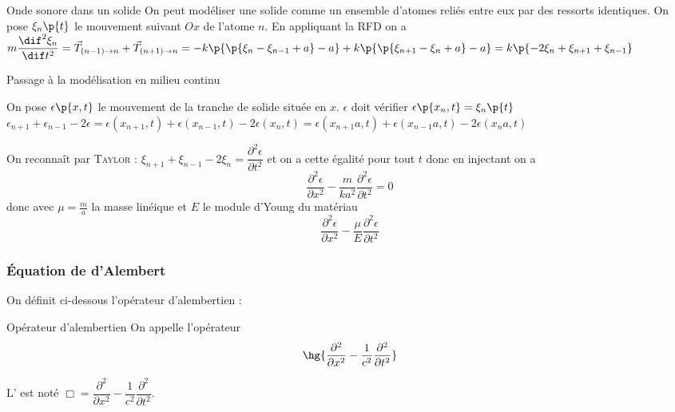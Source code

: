     \begin{example}{Onde sonore dans un solide}{}
        On peut modéliser une solide comme un ensemble d'atomes reliés entre eux par des ressorts identiques. On pose $\xi_n\p{t}$ le mouvement suivant $Ox$ de l'atome $n$. En appliquant la RFD on a $m\dfrac{\dif^2\xi_n}{\dif t^2}=\vec{T}_{(n-1)\to n} + \vec{T}_{(n+1)\to n} = -k\p{\p{\xi_n - \xi_{n-1}+a}-a} + k\p{\p{\xi_{n+1}-\xi_n+a}-a} = k\p{-2\xi_n+\xi_{n+1}+\xi_{n-1}}$

        Passage à la modélisation en milieu continu

        On pose $\epsilon\p{x,t}$ le mouvement de la tranche de solide située en $x$. $\epsilon$ doit vérifier $\epsilon\p{x_n,t}=\xi_n\p{t}$
        $\epsilon_{n+1} + \epsilon_{n-1} - 2\epsilon = \epsilon(x_{n+1},t) + \epsilon(x_{n-1},t) - 2\epsilon(x_n,t) = \epsilon(x_{n+1}a,t) + \epsilon(x_{n-1}a,t) - 2\epsilon(x_na,t)$

        On reconnaît par \textsc{Taylor} : $\xi_{n+1}+\xi_{n-1}-2\xi_n=\dfrac{\partial^2\epsilon}{\partial t^2}$ et on a cette égalité pour tout $t$ donc en injectant on a 
        \[\dfrac{\partial^2\epsilon}{\partial x^2} -\dfrac{m}{ka^2}\dfrac{\partial^2\epsilon}{\partial t^2} = 0 \]
        donc avec $\mu=\frac{m}{a}$ la masse linéique et $E$ le module d'Young du matériau 
        \[\dfrac{\partial^2\epsilon}{\partial x^2} -\dfrac{\mu}{E}\dfrac{\partial^2\epsilon}{\partial t^2}\]
    \end{example}
    
    \subsubsection{Équation de d'Alembert}
    
    On définit ci-dessous l'opérateur d'alembertien :
    
    \begin{definition}{Opérateur d'alembertien}{}
        On appelle  l'opérateur 
        \[ \hg{\dfrac{\partial^2}{\partial x^2} - \dfrac{1}{c^2}\dfrac{\partial^2}{\partial t^2}}\]
    \end{definition}
    \begin{notation}
        L' est noté $\Box = \dfrac{\partial^2}{\partial x^2} - \dfrac{1}{c^2}\dfrac{\partial^2}{\partial t^2}$.
    \end{notation}
    
